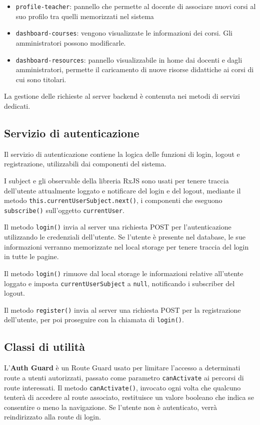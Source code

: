 \begin{itemize}
\begin{itemize}
\end{itemize}
	\item \texttt{profile-teacher}: pannello che permette al docente di associare nuovi corsi al suo profilo tra quelli memorizzati nel sistema
	\item \texttt{dashboard-courses}: vengono visualizzate le informazioni dei corsi. Gli amministratori possono modificarle.
	\item \texttt{dashboard-resources}: pannello visualizzabile in home dai docenti e dagli amministratori, permette il caricamento di nuove risorse didattiche ai corsi di cui sono titolari.
\end{itemize}

La gestione delle richieste al server backend è contenuta nei metodi di servizi dedicati.

\subsection{Servizio di autenticazione}
Il servizio di autenticazione contiene la logica delle funzioni di login, logout e registrazione, utilizzabili dai componenti del sistema.

I subject e gli observable della libreria RxJS sono usati per tenere traccia dell'utente attualmente loggato e notificare del login e del logout, mediante il metodo \texttt{this.currentUserSubject.next()}, i componenti che eseguono \texttt{subscribe()} sull'oggetto \texttt{currentUser}.

Il metodo \texttt{login()} invia al server una richiesta POST per l'autenticazione utilizzando le credenziali dell'utente. Se l'utente è presente nel database, le sue informazioni verranno memorizzate nel local storage per tenere traccia del login in tutte le pagine.

Il metodo \texttt{login()} rimuove dal local storage le informazioni relative all'utente loggato e imposta \texttt{currentUserSubject} a \texttt{null}, notificando i subscriber del logout.

Il metodo \texttt{register()} invia al server una richiesta POST per la registrazione dell'utente, per poi proseguire con la chiamata di \texttt{login()}.

\subsection{Classi di utilità}

L'\textbf{Auth Guard} è un Route Guard usato per limitare l'accesso a determinati route a utenti autorizzati, passato come parametro \texttt{canActivate} ai percorsi di route interessati. Il metodo \texttt{canActivate()}, invocato ogni volta che qualcuno tenterà di accedere al route associato, restituisce un valore booleano che indica se consentire o meno la navigazione. Se l’utente non è autenticato, verrà reindirizzato alla route di login.

